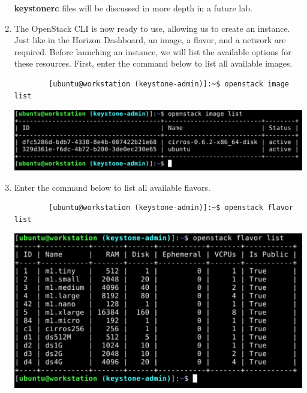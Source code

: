 \documentclass[letterpaper, 12pt]{article}
\begin{document}
\begin{enumerate}
    \begin{notebox}
        \textbf{keystonerc} files will be discussed in more depth in a future lab.
    \end{notebox}

    \item The OpenStack CLI is now ready to use, allowing us to create an instance. Just like in the Horizon Dashboard, an image, a flavor, and a network are required. Before launching an instance, we will list the available options for these resources. First, enter the command below to list all available images.
    \begin{lstlisting}
        [ubuntu@workstation (keystone-admin)]:~$ openstack image list
    \end{lstlisting}

    \begin{center}
        \includegraphics[width=\linewidth]{images/part2/step3.png}
    \end{center}

    \item Enter the command below to list all available flavors.
    \begin{lstlisting}
        [ubuntu@workstation (keystone-admin)]:~$ openstack flavor list
    \end{lstlisting}

    \begin{center}
        \includegraphics[width=\linewidth]{images/part2/step4.png}
    \end{center}


\end{enumerate}
\end{document}
